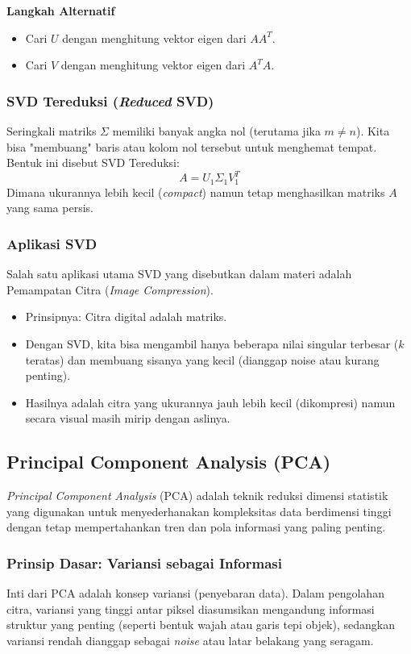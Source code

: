 \documentclass[12pt,a4paper]{article}
\begin{document}
\noindent \textbf{Langkah Alternatif}
\begin{itemize}
    \item Cari $U$ dengan menghitung vektor eigen dari $A A^T$.
    \item Cari $V$ dengan menghitung vektor eigen dari $A^T A$.
\end{itemize}

\subsubsection{SVD Tereduksi (\textit{Reduced} SVD)}
Seringkali matriks $\Sigma$ memiliki banyak angka nol (terutama jika $m \neq n$). Kita bisa "membuang" baris atau kolom nol tersebut untuk menghemat tempat.
Bentuk ini disebut SVD Tereduksi:
$$A = U_1 \Sigma_1 V_1^T$$
Dimana ukurannya lebih kecil (\textit{compact}) namun tetap menghasilkan matriks $A$ yang sama persis.

\subsubsection{Aplikasi SVD}
Salah satu aplikasi utama SVD yang disebutkan dalam materi adalah Pemampatan Citra (\textit{Image Compression}).
\begin{itemize}
    \item Prinsipnya: Citra digital adalah matriks.
    \item Dengan SVD, kita bisa mengambil hanya beberapa nilai singular terbesar ($k$ teratas) dan membuang sisanya yang kecil (dianggap noise atau kurang penting).
    \item Hasilnya adalah citra yang ukurannya jauh lebih kecil (dikompresi) namun secara visual masih mirip dengan aslinya.
\end{itemize}

\subsection{Principal Component Analysis (PCA)}
\textit{Principal Component Analysis} (PCA) adalah teknik reduksi dimensi statistik yang digunakan untuk menyederhanakan kompleksitas data berdimensi tinggi dengan tetap mempertahankan tren dan pola informasi yang paling penting.

\subsubsection{Prinsip Dasar: Variansi sebagai Informasi}
Inti dari PCA adalah konsep variansi (penyebaran data). Dalam pengolahan citra, variansi yang tinggi antar piksel diasumsikan mengandung informasi struktur yang penting (seperti bentuk wajah atau garis tepi objek), sedangkan variansi rendah dianggap sebagai \textit{noise} atau latar belakang yang seragam.
\end{document}
